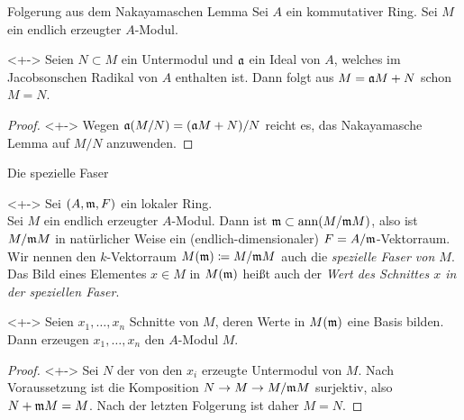 \begin{frame}{Folgerung aus dem Nakayamaschen Lemma}
	Sei \(A\) ein kommutativer Ring. Sei \(M\) ein endlich erzeugter \(A\)-Modul.
	\begin{corollary}<+->
		Seien \(N \subset M\) ein Untermodul und \(\mathfrak{a}\) ein Ideal von \(A\), welches im
		Jacobsonschen Radikal von \(A\) enthalten ist. Dann folgt aus \(M = \mathfrak{a} M + N\) schon
		\(M = N\).
	\end{corollary}
	\begin{proof}<+->
		Wegen \(\mathfrak{a} (M/N) = (\mathfrak{a} M + N)/N\) reicht es, das Nakayamasche Lemma auf \(M/N\) 
		anzuwenden.
	\end{proof}
\end{frame}

\begin{frame}{Die spezielle Faser}
	\begin{visibleenv}<+->
		Sei \((A, \mathfrak{m}, F)\) ein lokaler Ring.
		\\
		Sei \(M\) ein endlich erzeugter \(A\)-Modul. Dann ist \(\mathfrak{m} \subset \operatorname{ann} (M/\mathfrak{m} M)\), also
		ist \(M/\mathfrak{m} M\) in natürlicher Weise ein (endlich-dimensionaler) \(F = A/\mathfrak{m}\)-Vektorraum.
		\\
		Wir nennen den \(k\)-Vektorraum \(M(\mathfrak{m}) \coloneqq M/\mathfrak{m} M\) auch die \emph{spezielle Faser
		von \(M\)}.
		\\
		Das Bild eines Elementes \(x \in M\) in \(M(\mathfrak{m})\) heißt auch der \emph{Wert des Schnittes
		\(x\) in der speziellen Faser}.
	\end{visibleenv}
	\begin{proposition}<+->
		Seien \(x_1, \dotsc, x_n\) Schnitte von \(M\), deren Werte in \(M(\mathfrak{m})\) eine Basis bilden.
		Dann erzeugen \(x_1, \dotsc, x_n\) den \(A\)-Modul \(M\).
	\end{proposition}
	\begin{proof}<+->
		Sei \(N\) der von den \(x_i\) erzeugte Untermodul von \(M\). Nach Voraussetzung ist die
		Komposition \(N \to M \to M/\mathfrak{m} M\) surjektiv, also \(N + \mathfrak{m} M = M\).
		Nach der letzten Folgerung ist daher \(M = N\).
	\end{proof}
\end{frame}
